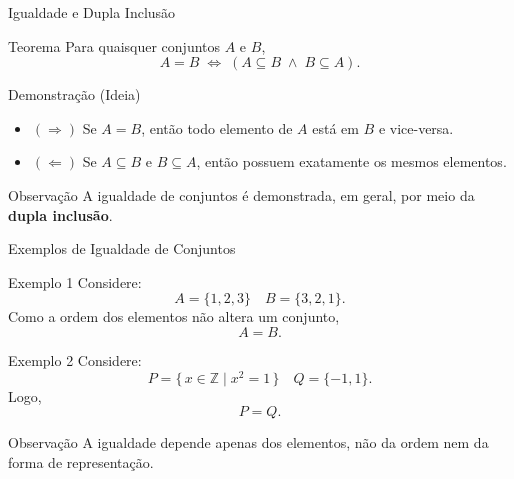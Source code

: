 \documentclass[9pt]{beamer}
\begin{document}
\begin{frame}{Igualdade e Dupla Inclusão}

\begin{block}{Teorema}
Para quaisquer conjuntos $A$ e $B$,
\[
A = B 
\;\Longleftrightarrow\;
(A \subseteq B \;\land\; B \subseteq A).
\]
\end{block}

\begin{block}{Demonstração (Ideia)}
\begin{itemize}
\item $(\Rightarrow)$ Se $A = B$, então todo elemento de $A$ está em $B$ e vice-versa.
\item $(\Leftarrow)$ Se $A \subseteq B$ e $B \subseteq A$, então possuem exatamente os mesmos elementos.
\end{itemize}
\end{block}

\begin{block}{Observação}
A igualdade de conjuntos é demonstrada, em geral, por meio da \textbf{dupla inclusão}.
\end{block}

\end{frame}
\begin{frame}{Exemplos de Igualdade de Conjuntos}

\begin{block}{Exemplo 1}
Considere:
\[
A = \{1,2,3\}
\quad
B = \{3,2,1\}.
\]
Como a ordem dos elementos não altera um conjunto,
\[
A = B.
\]
\end{block}

\begin{block}{Exemplo 2}
Considere:
\[
P = \{\, x \in \mathbb{Z} \mid x^2 = 1 \,\}
\quad
Q = \{-1,1\}.
\]
Logo,
\[
P = Q.
\]
\end{block}

\begin{block}{Observação}
A igualdade depende apenas dos elementos,  
não da ordem nem da forma de representação.
\end{block}

\end{frame}
\end{document}
